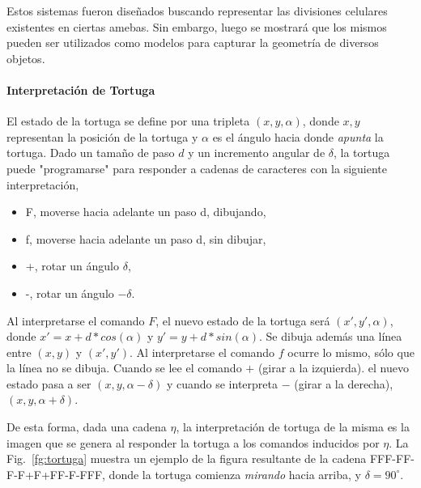 Estos sistemas fueron diseñados buscando representar las divisiones celulares existentes en ciertas amebas.
Sin embargo, luego se mostrará que los mismos pueden ser utilizados como modelos para capturar la geometría de diversos objetos.

\paragraph{Interpretación de Tortuga}
El estado de la tortuga se define por una tripleta $(x,y,\alpha)$, donde $x,y$ representan la posición de la tortuga y $\alpha$ es el ángulo hacia donde {\em apunta} la tortuga.
Dado un tamaño de paso $d$ y un incremento angular de $\delta$, la tortuga puede "programarse" para responder a cadenas de caracteres con la siguiente interpretación,

\begin{itemize}
\item F, moverse hacia adelante un paso d, dibujando,
\item f, moverse hacia adelante un paso d, sin dibujar,
\item +, rotar un ángulo $\delta$,
\item -, rotar un ángulo $-\delta$.
\end{itemize}

Al interpretarse el comando $F$, el nuevo estado de la tortuga será $(x',y',\alpha)$, donde $x' = x + d * cos(\alpha)$ y $y' = y + d * sin(\alpha)$. Se dibuja además una línea entre $(x,y)$ y $(x',y')$.
Al interpretarse el comando $f$ ocurre lo mismo, sólo que la línea no se dibuja.
Cuando se lee el comando $+$ (girar a la izquierda). el nuevo estado pasa a ser $(x,y,\alpha-\delta)$ y cuando se interpreta $-$ (girar a la derecha),  $(x,y,\alpha+\delta)$.

De esta forma, dada una cadena $\eta$, la interpretación de tortuga de la misma es la imagen que se genera al responder la tortuga a los comandos inducidos por $\eta$.
La Fig.~\ref{fg:tortuga} muestra un ejemplo de la figura resultante de la cadena FFF-FF-F-F+F+FF-F-FFF, donde la tortuga comienza {\em mirando} hacia arriba, y $\delta = 90^{\circ}$.

